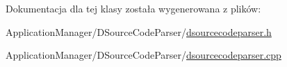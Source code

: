 Dokumentacja dla tej klasy została wygenerowana z plików\-:\begin{DoxyCompactItemize}
\item 
Application\-Manager/\-D\-Source\-Code\-Parser/\hyperlink{dsourcecodeparser_8h}{dsourcecodeparser.\-h}\item 
Application\-Manager/\-D\-Source\-Code\-Parser/\hyperlink{dsourcecodeparser_8cpp}{dsourcecodeparser.\-cpp}\end{DoxyCompactItemize}
